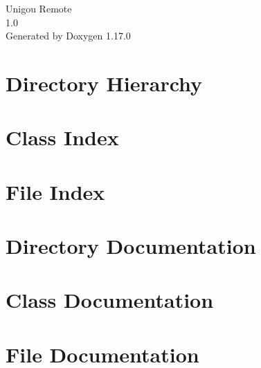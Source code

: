 \documentclass[twoside]{book}
\newcommand{\+}{\discretionary{\mbox{\scriptsize$\hookleftarrow$}}{}{}}
\newcommand{\clearemptydoublepage}{%
    \newpage{\pagestyle{empty}\cleardoublepage}%
  }
\begin{document}
  \raggedbottom
    \hypersetup{pageanchor=false,
                bookmarksnumbered=true,
                pdfencoding=unicode
               }
  \begin{titlepage}
  \vspace*{7cm}
  \begin{center}%
  {\Large Unigou Remote}\\
  [1ex]\large 1.\+0 \\
  \vspace*{1cm}
  {\large Generated by Doxygen 1.17.0}\\
  \end{center}
  \end{titlepage}
  \clearemptydoublepage
  \tableofcontents
  \clearemptydoublepage
  \hypersetup{pageanchor=true}
\chapter{Directory Hierarchy}

\chapter{Class Index}

\chapter{File Index}

\chapter{Directory Documentation}


\chapter{Class Documentation}


\chapter{File Documentation}


















  \backmatter
  \newpage
  \clearemptydoublepage
  \printindex
\end{document}
